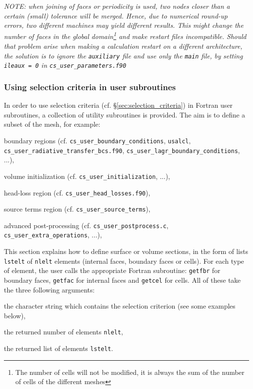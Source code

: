 {{{{{\em NOTE: when joining of faces or periodicity is used, two nodes closer
than a certain (small) tolerance will be merged. Hence, due to numerical
round-up errors, two different machines may yield different results.
This might change the number of faces in the global
domain\footnote{The number of cells will not be modified, it is always the sum of the
number of cells of the different meshes} and make restart files
incompatible. Should that problem arise when making a calculation restart on a
different architecture, the solution is to ignore the \texttt{auxiliary}
file and use only the \texttt{main} file, by setting \texttt{ileaux = 0}
in \texttt{cs\_user\_parameters.f90}}

\subsubsection{Using selection criteria in user subroutines}
\label{sec:fvm_selector}

In order to use selection criteria (cf. \S\ref{sec:selection_criteria}) in Fortran
user subroutines, a collection of utility subroutines is provided. The aim is to
define a subset of the mesh, for example:

\begin{list}{-}{}
\item boundary regions (cf. \texttt{cs\_user\_boundary\_conditions}, \texttt{usalcl},
\texttt{cs\_user\_radiative\_transfer\_bcs.f90}, \texttt{cs\_user\_lagr\_boundary\_conditions}, ...),
\item volume initialization (cf. \texttt{cs\_user\_initialization}, ...),
\item head-loss region (cf. \texttt{cs\_user\_head\_losses.f90}),
\item source terms region (cf. \texttt{cs\_user\_source\_terms}),
\item advanced post-processing (cf. \texttt{cs\_user\_postprocess.c},
      \texttt{cs\_user\_extra\_operations}, ...),
\end{list}

This section explains how to define surface or volume sections,
in the form of lists \texttt{lstelt} of \texttt{nlelt} elements
(internal faces, boundary faces or cells).
For each type of element, the user calls the appropriate Fortran
subroutine: \texttt{getfbr}
for boundary faces, \texttt{getfac} for internal faces
and \texttt{getcel} for cells. All of these take
the three following arguments:
\begin{list}{-}{}
\item the character string which contains the selection
      criterion (see some examples below),
\item the returned number of elements \texttt{nlelt},
\item the returned list of elements \texttt{lstelt}.
\end{list}

}}}}
